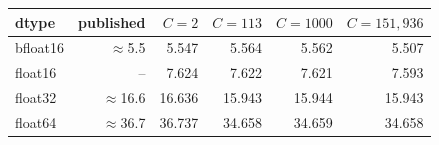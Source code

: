 \begin{tabular}{lrrrrr}
\toprule
dtype & published & $C{=}2$ & $C{=}113$ & $C{=}1000$ & $C{=}151{,}936$ \\
\midrule
bfloat16 & $\approx$5.5 & 5.547 & 5.564 & 5.562 & 5.507 \\
float16 & -- & 7.624 & 7.622 & 7.621 & 7.593 \\
float32 & $\approx$16.6 & 16.636 & 15.943 & 15.944 & 15.943 \\
float64 & $\approx$36.7 & 36.737 & 34.658 & 34.659 & 34.658 \\
\bottomrule
\end{tabular}

